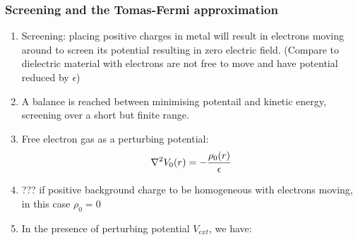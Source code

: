 \documentclass[12pt,a4paper]{article}
\begin{document}
        \subsubsection{Screening and the Tomas-Fermi approximation}
            \begin{enumerate}
                \item Screening: placing positive charges in metal will result in electrons moving around to screen its potential resulting in zero electric field. (Compare to dielectric material with electrons are not free to move and have potential reduced by $\epsilon$)
                \item A balance is reached between minimising potentail and kinetic energy, screening over a short but finite range.
                \item Free electron gas as a perturbing potential:
                \begin{equation}
                    \laplacian {V_0}(r) = - \frac{\rho_0(r)}{\epsilon}
                \end{equation}
                \item ??? if positive background charge to be homogeneous with electrons moving, in this case $\rho_0 =0$
                \item In the presence of perturbing potential $V_{ext}$, we have:
            \end{enumerate}


            
        
    
\end{document}
